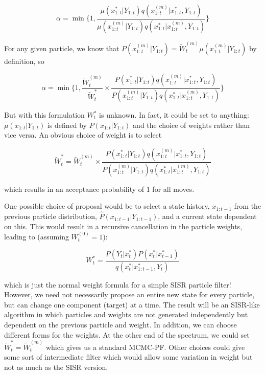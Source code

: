 \begin{equation}
\alpha = \min \bigg \{ 1, \frac{\mu(x_{1:t}^{*}|Y_{1:t})q(x_{1:t}^{(m)}|x_{1:t}^{*}, Y_{1:t})}{\mu(x_{1:t}^{(m)}|Y_{1:t})q(x_{1:t}^{*}|x_{1:t}^{(m)}, Y_{1:t})} \bigg \}
\end{equation}

For any given particle, we know that $P(x_{1:t}^{(m)}|Y_{1:t}) = \tilde{W}_t^{(m)} \mu(x_{1:t}^{(m)}|Y_{1:t})$ by definition, so

\begin{equation}
\alpha = \min \bigg \{ 1, \frac{\tilde{W}_t^{(m)}}{\tilde{W}_t^{*}} \times \frac{P(x_{1:t}^{*}|Y_{1:t})q(x_{1:t}^{(m)}|x_{1:t}^{*}, Y_{1:t})}{P(x_{1:t}^{(m)}|Y_{1:t})q(x_{1:t}^{*}|x_{1:t}^{(m)}, Y_{1:t})} \bigg \}
\end{equation}

But with this formulation $W_t^{*}$ is unknown. In fact, it could be set to anything: $\mu(x_{1:t}|Y_{1:t})$ is defined by $P(x_{1:t}|Y_{1:t})$ and the choice of weights rather than vice versa. An obvious choice of weight is to select

\begin{equation}
\tilde{W}_t^{*} = \tilde{W}_t^{(m)} \times \frac{P(x_{1:t}^{*}|Y_{1:t})q(x_{1:t}^{(m)}|x_{1:t}^{*}, Y_{1:t})}{P(x_{1:t}^{(m)}|Y_{1:t})q(x_{1:t}^{*}|x_{1:t}^{(m)}, Y_{1:t})}
\end{equation}

which results in an acceptance probability of 1 for all moves.

One possible choice of proposal would be to select a state history, $x_{1:t-1}$ from the previous particle distribution, $\hat{P}(x_{1:t-1}|Y_{1:t-1})$, and a current state dependent on this. This would result in a recursive cancellation in the particle weights, leading to (assuming $W_t^{(0)}=1$):

\begin{equation}
W_t^{*} = \frac{P(Y_t|x_t^{*})P(x_t^{*}|x_{t-1}^{*})}{q(x_{t}^{*}|x_{1:t-1}^{*}, Y_{t})}
\end{equation}

which is just the normal weight formula for a simple SISR particle filter! However, we need not necessarily propose an entire new state for every particle, but can change one component (target) at a time. The result will be an SISR-like algorithm in which particles and weights are not generated independently but dependent on the previous particle and weight. In addition, we can choose different forms for the weights. At the other end of the spectrum, we could set $\tilde{W}_t^{*}=\tilde{W}_t^{(m)}$ which gives us a standard MCMC-PF. Other choices could give some sort of intermediate filter which would allow some variation in weight but not as much as the SISR version.

